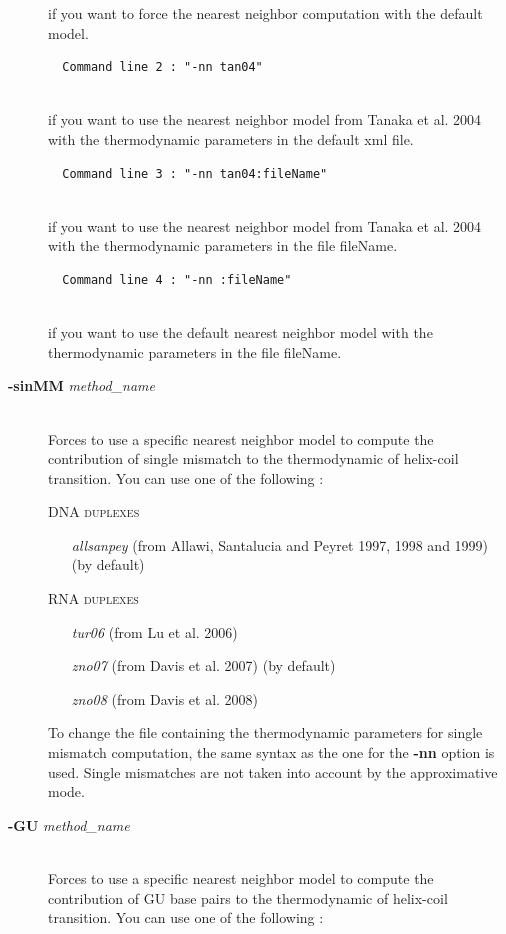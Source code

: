 \documentclass{article}
\begin{document}
\begin{description}
\begin{verbatim}
  \end{verbatim}
  if you want to force the nearest neighbor computation with the default model.
  
  \begin{verbatim}
  Command line 2 : "-nn tan04" 
  
  \end{verbatim}
  if you want to use the nearest neighbor model from Tanaka et al. 2004 with the 
  thermodynamic parameters in the default xml file.
  
  \begin{verbatim}
  Command line 3 : "-nn tan04:fileName" 
  
  \end{verbatim}
  if you want to use the nearest neighbor model from Tanaka et al. 2004 with the 
  thermodynamic parameters in the file fileName.
  
  \begin{verbatim}
  Command line 4 : "-nn :fileName" 
  
  \end{verbatim}
  if you want to use the default nearest neighbor model with the thermodynamic parameters in the file fileName.
  		  
\item [\textbf{-sinMM} \textit{method\_name}]\mbox{}\\ 
  Forces to use a specific nearest neighbor model to compute the contribution of single mismatch to the thermodynamic of helix-coil transition. 
  You can use one of the following :
  
  \textsc{DNA duplexes}
    \begin{itemize}
    \item [\textit{allsanpey}] (from Allawi, Santalucia and Peyret 1997, 1998 and 1999)  (by default) 
    \end{itemize}
  \textsc{RNA duplexes}
    \begin{itemize}
    \item [\textit{tur06}] (from Lu et al. 2006)
    \item [\textit{zno07}] (from Davis et al. 2007)  (by default)
    \item [\textit{zno08}] (from Davis et al. 2008)		 		 
    \end{itemize}
  To change the file containing the thermodynamic parameters for single mismatch computation, the same syntax as the one for the \textbf{-nn} option is used.
  Single mismatches are not taken into account by the approximative mode.
\item [\textbf{-GU} \textit{method\_name}]\mbox{}\\ 
  Forces to use a specific nearest neighbor model to compute the contribution of GU base pairs to the thermodynamic of helix-coil transition. 
  You can use one of the following :
  

\end{description}
\end{document}
